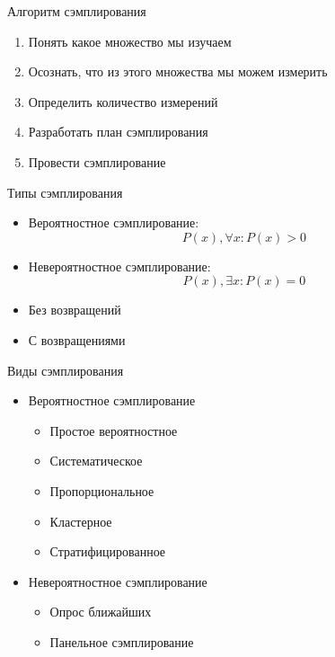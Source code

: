 \documentclass[14pt, fleqn, xcolor={dvipsnames, table}]{beamer}
\begin{document}
\begin{frame}{Алгоритм сэмплирования}
\begin{enumerate}
   \item Понять какое множество мы изучаем
   \item Осознать, что из этого множества мы можем измерить
   \item Определить количество измерений
   \item Разработать план сэмплирования
   \item Провести сэмплирование
\end{enumerate}
\end{frame}

\begin{frame}{Типы сэмплирования}
\begin{itemize}
   \item Вероятностное сэмплирование: 
   $$
   P(x),\forall x:P(x) > 0
   $$
   \item Невероятностное сэмплирование:
   $$
   P(x), \exists x: P(x) = 0
   $$
   \item Без возвращений
   \item С возвращениями
\end{itemize}
\end{frame}

\begin{frame}{Виды сэмплирования}
\begin{itemize}
   \item Вероятностное сэмплирование
   \begin{itemize}
    \item Простое вероятностное
    \item Систематическое
    \item Пропорциональное
    \item Кластерное
    \item Стратифицированное
   \end{itemize}
   \item Невероятностное сэмплирование
   \begin{itemize}
    \item Опрос ближайших
    \item Панельное сэмплирование
   \end{itemize}
\end{itemize}
\end{frame}
\end{document}
